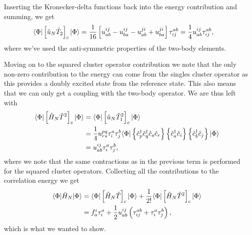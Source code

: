         Inserting the Kronecker-delta functions back into the energy
        contribution and summing, we get
        \begin{align}
            \langle \Phi |\left[ 
                \hat{u}_N \hat{T}_2
             \right]_c
            | \Phi \rangle
            &=
            \frac{1}{16}\left[ 
                u^{ij}_{ab}
                - u^{ij}_{ba}
                - u^{ji}_{ab}
                + u^{ji}_{ba}
             \right]\tau^{ab}_{ij}
            =
            \frac{1}{4}u^{ij}_{ab}\tau^{ab}_{ij},
        \end{align}
        where we've used the anti-symmetric properties of the two-body
        elements.

        Moving on to the squared cluster operator contribution we note that the
        only non-zero contribution to the energy can come from the singles
        cluster operator as this provides a doubly excited state from the
        reference state.
        This also means that we can only get a coupling with the two-body
        operator.
        We are thus left with
        \begin{align}
            \langle \Phi |\left[ 
                \hat{H}_N \hat{T}^2
             \right]_c
            | \Phi \rangle
            &=
            \langle \Phi |\left[ 
                \hat{u}_N \hat{T}_1^2
             \right]_c
            | \Phi \rangle
            \\
            &=
            \frac{1}{4}u^{pq}_{rs}\tau^{a}_{i}\tau^{b}_{j}
            \langle \Phi |
            \left\{ 
                \hat{c}_{p}^{\dagger}
                \hat{c}_{q}^{\dagger}
                \hat{c}_{s}
                \hat{c}_{r}
             \right\}
            \left\{ 
                \hat{c}_{a}^{\dagger}
                \hat{c}_{i}
             \right\}
            \left\{ 
                \hat{c}_{b}^{\dagger}
                \hat{c}_{j}
             \right\}
            | \Phi \rangle
            \\
            &=
            u^{ij}_{ab}\tau^{a}_{i}\tau^{b}_{j},
        \end{align}
        where we note that the same contractions as in the previous term is
        performed for the squared cluster operators.
        Collecting all the contributions to the correlation energy we get
        \begin{align}
            \langle \Phi |\bar{H}_N| \Phi \rangle
            &=
            \langle \Phi |\left[ 
                \hat{H}_N\hat{T}
             \right]_{c}| \Phi \rangle
            + \frac{1}{2!}
            \langle \Phi |\left[ 
                \hat{H}_N\hat{T}^2
             \right]_{c}| \Phi \rangle
            \\
            &=
            f^{i}_{a}\tau^{a}_{i}
            + \frac{1}{2} u^{ij}_{ab}\left( 
                \tau^{ab}_{ij}
                + \tau^{a}_{i}\tau^{b}_{j}
             \right),
        \end{align}
        which is what we wanted to show.

